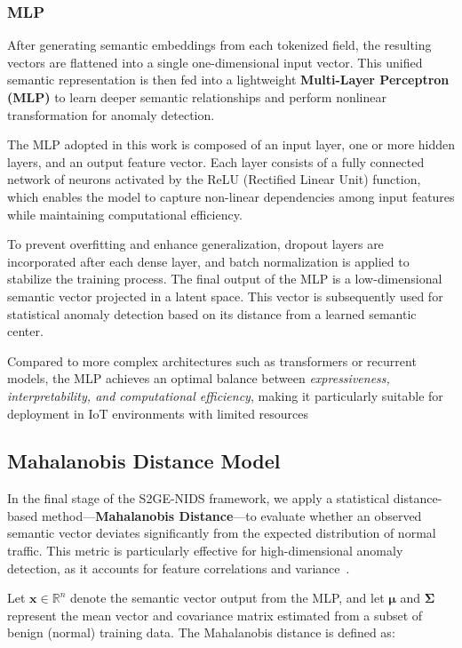 \begin{ZhChapter}
\subsubsection{MLP}
After generating semantic embeddings from each tokenized field, the resulting vectors are flattened into a single one-dimensional input vector. This unified semantic representation is then fed into a lightweight \textbf{Multi-Layer Perceptron (MLP)} to learn deeper semantic relationships and perform nonlinear transformation for anomaly detection.

The MLP adopted in this work is composed of an input layer, one or more hidden layers, and an output feature vector. Each layer consists of a fully connected network of neurons activated by the ReLU (Rectified Linear Unit) function, which enables the model to capture non-linear dependencies among input features while maintaining computational efficiency.

To prevent overfitting and enhance generalization, dropout layers are incorporated after each dense layer, and batch normalization is applied to stabilize the training process. The final output of the MLP is a low-dimensional semantic vector projected in a latent space. This vector is subsequently used for statistical anomaly detection based on its distance from a learned semantic center.

Compared to more complex architectures such as transformers or recurrent models, the MLP achieves an optimal balance between \textit{expressiveness, interpretability, and computational efficiency}, making it particularly suitable for deployment in IoT environments with limited resources~\cite{mlp2001universal}


\subsection{Mahalanobis Distance Model}
In the final stage of the S2GE-NIDS framework, we apply a statistical distance-based method—\textbf{Mahalanobis Distance}—to evaluate whether an observed semantic vector deviates significantly from the expected distribution of normal traffic. This metric is particularly effective for high-dimensional anomaly detection, as it accounts for feature correlations and variance~\cite{de2000mahalanobis}.

Let $\mathbf{x} \in \mathbb{R}^n$ denote the semantic vector output from the MLP, and let $\boldsymbol{\mu}$ and $\boldsymbol{\Sigma}$ represent the mean vector and covariance matrix estimated from a subset of benign (normal) training data. The Mahalanobis distance is defined as:


\end{ZhChapter}

